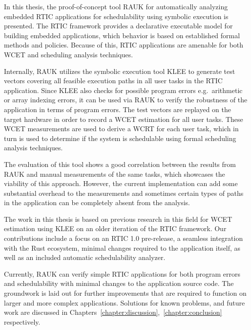 In this thesis, the proof-of-concept tool RAUK for automatically analyzing
embedded RTIC applications for schedulability using symbolic execution is presented.
The RTIC framework provides a declarative executable model for building
embedded applications, which behavior is based on established formal methods
and policies. Because of this, RTIC applications are amenable for both WCET and
scheduling analysis techniques.

Internally, RAUK utilizes the symbolic execution tool KLEE to generate test vectors
covering all feasible execution paths in all user tasks in the RTIC
application. Since KLEE also checks for possible program errors e.g.\ arithmetic or
array indexing errors, it can be used via RAUK to verify the robustness of the
application in terms of program errors. The test vectors are replayed on the
target hardware in order to record a WCET estimation for all user
tasks. These WCET measurements are used to derive a WCRT for each user task, which
in turn is used to determine if the system is schedulable using formal scheduling
analysis techniques.

The evaluation of this tool shows a good correlation between the results from
RAUK and manual measurements of the same tasks, which showcases the viability
of this approach. However, the current implementation can add some substantial
overhead to the measurements and sometimes certain types of paths in the
application can be completely absent from the analysis.

The work in this thesis is based on previous research in this field for WCET
estimation using KLEE on an older iteration of the RTIC framework. Our
contributions include a focus on an RTIC 1.0 pre-release, a seamless
integration with the Rust ecosystem, minimal changes required to the
application itself, as well as an included automatic schedulability analyzer.

Currently, RAUK can verify simple RTIC applications for both program errors and
schedulability with minimal changes to the application source code. The
groundwork is laid out for further improvements that are required to function
on larger and more complex applications. Solutions for known problems, and future work
are discussed in Chapters~\ref{chapter:discussion},~\ref{chapter:conclusion} respectively.
